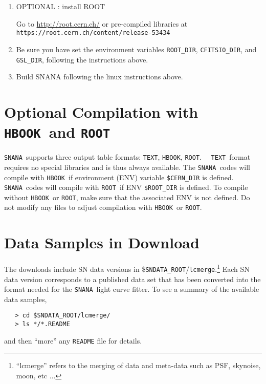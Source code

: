\documentclass[12pt]{article}
\newcommand{\snana}{{\tt SNANA}}
\newcommand{\sndataroot}{{\tt SNDATA\_ROOT}}
\newcommand{\ROOT}{{\tt ROOT}}
\newcommand{\HBOOK}{{\tt HBOOK}}
\newcommand{\TEXT}{{\tt TEXT}}
\begin{document}
\begin{enumerate}
\begin{verbatim}
# upgrade the libraries
brew install gsl
brew install cfitsio
\end{verbatim}

Before upgrading SNANA in the future you can first upgrade these libraries using: 

\begin{verbatim}
brew update
brew upgrade gsl
brew upgrade cfitsio
\end{verbatim}

\item OPTIONAL : install ROOT 

Go to \url{http://root.cern.ch/} or pre-compiled libraries at \\
{\tt https://root.cern.ch/content/release-53434}


\item Be sure you have set the environment variables %
      {\tt ROOT\_DIR}, {\tt CFITSIO\_DIR}, and {\tt GSL\_DIR}, 
      following the instructions above. 
  
\item Build SNANA following the linux instructions above. 

\end{enumerate}


  \section{Optional Compilation with \HBOOK\ and {\ROOT} }
  \label{sec:hbookroot}

\snana\ supports three output table formats:
\TEXT, \HBOOK, \ROOT.~~
\TEXT\ format requires no special libraries and is thus 
always available.
The \snana\ codes will compile with \HBOOK\ if 
environment (ENV) variable  {\tt\$CERN\_DIR} is defined.
\snana\ codes will compile with \ROOT\ if ENV {\tt\$ROOT\_DIR} 
is defined. 
To compile without \HBOOK\ or \ROOT, make sure that the 
associated ENV is not defined. Do not modify any files to 
adjust compilation with \HBOOK\ or \ROOT.


   \section{Data Samples in Download}
   \label{sec:data}

The downloads include SN data versions in 
\$\sndataroot/{\tt lcmerge}.\footnote{
``lcmerge'' refers to the merging of data and meta-data
such as PSF, skynoise, moon, etc ...}
Each SN data version corresponds to a published data set
that has been converted into the format needed
for the \snana\ light curve fitter.
To see a summary of the available data samples,
\begin{verbatim}
   > cd $SNDATA_ROOT/lcmerge/
   > ls */*.README
\end{verbatim}
and then ``more'' any {\tt README} file for details.


    
\end{document}
